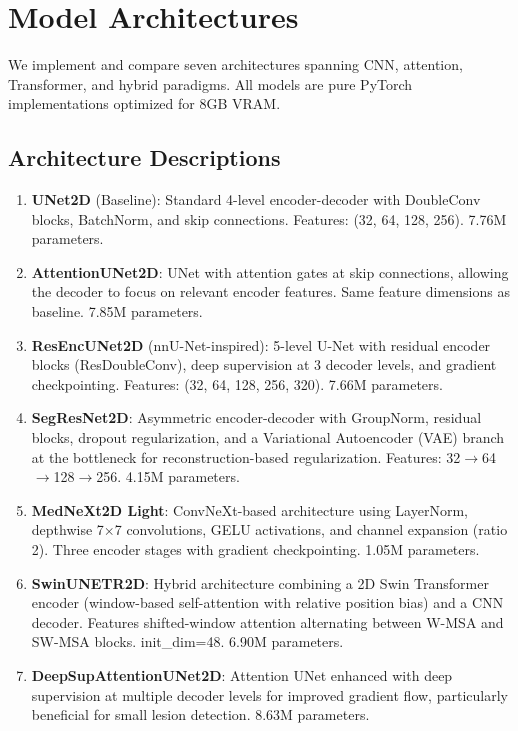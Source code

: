 \documentclass[11pt,a4paper]{article}
\begin{document}
\section{Model Architectures}
We implement and compare seven architectures spanning CNN, attention, Transformer, and hybrid paradigms. All models are pure PyTorch implementations optimized for 8GB VRAM.

\subsection{Architecture Descriptions}

\begin{enumerate}
  \item \textbf{UNet2D} (Baseline): Standard 4-level encoder-decoder with DoubleConv blocks, BatchNorm, and skip connections. Features: (32, 64, 128, 256). 7.76M parameters.
  
  \item \textbf{AttentionUNet2D}: UNet with attention gates at skip connections, allowing the decoder to focus on relevant encoder features. Same feature dimensions as baseline. 7.85M parameters.
  
  \item \textbf{ResEncUNet2D} (nnU-Net-inspired): 5-level U-Net with residual encoder blocks (ResDoubleConv), deep supervision at 3 decoder levels, and gradient checkpointing. Features: (32, 64, 128, 256, 320). 7.66M parameters.
  
  \item \textbf{SegResNet2D}: Asymmetric encoder-decoder with GroupNorm, residual blocks, dropout regularization, and a Variational Autoencoder (VAE) branch at the bottleneck for reconstruction-based regularization. Features: 32$\to$64$\to$128$\to$256. 4.15M parameters.
  
  \item \textbf{MedNeXt2D Light}: ConvNeXt-based architecture using LayerNorm, depthwise 7$\times$7 convolutions, GELU activations, and channel expansion (ratio 2). Three encoder stages with gradient checkpointing. 1.05M parameters.
  
  \item \textbf{SwinUNETR2D}: Hybrid architecture combining a 2D Swin Transformer encoder (window-based self-attention with relative position bias) and a CNN decoder. Features shifted-window attention alternating between W-MSA and SW-MSA blocks. init\_dim=48. 6.90M parameters.
  
  \item \textbf{DeepSupAttentionUNet2D}: Attention UNet enhanced with deep supervision at multiple decoder levels for improved gradient flow, particularly beneficial for small lesion detection. 8.63M parameters.
\end{enumerate}
\end{document}
